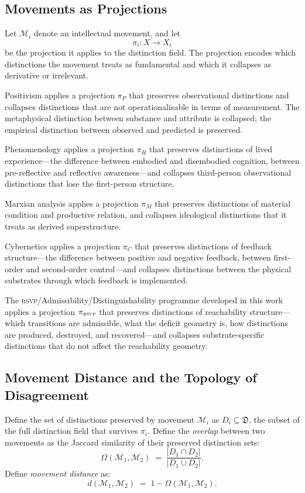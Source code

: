 \documentclass[12pt, letterpaper]{article}
\theoremstyle{remark}
\newcommand{\rsvp}{\textsc{rsvp}}
\begin{document}
\subsection{Movements as Projections}

Let $\mathcal{M}_i$ denote an intellectual movement, and let
\[
  \pi_i : X \to X_i
\]
be the projection it applies to the distinction field.  The projection encodes
which distinctions the movement treats as fundamental and which it collapses
as derivative or irrelevant.

Positivism applies a projection $\pi_P$ that preserves observational
distinctions and collapses distinctions that are not operationalisable in
terms of measurement.  The metaphysical distinction between substance and
attribute is collapsed; the empirical distinction between observed and
predicted is preserved.

Phenomenology applies a projection $\pi_H$ that preserves distinctions of
lived experience---the difference between embodied and disembodied cognition,
between pre-reflective and reflective awareness---and collapses third-person
observational distinctions that lose the first-person structure.

Marxian analysis applies a projection $\pi_M$ that preserves distinctions of
material condition and productive relation, and collapses ideological
distinctions that it treats as derived superstructure.

Cybernetics applies a projection $\pi_C$ that preserves distinctions of
feedback structure---the difference between positive and negative feedback,
between first-order and second-order control---and collapses distinctions
between the physical substrates through which feedback is implemented.

The \rsvp{}/Admissibility/Distinguishability programme developed in this work
applies a projection $\pi_{\rsvp{}}$ that preserves distinctions of
reachability structure---which transitions are admissible, what the deficit
geometry is, how distinctions are produced, destroyed, and recovered---and
collapses substrate-specific distinctions that do not affect the reachability
geometry.

\subsection{Movement Distance and the Topology of Disagreement}

Define the set of distinctions preserved by movement $\mathcal{M}_i$ as
$D_i \subseteq \mathfrak{D}$, the subset of the full distinction field that
survives $\pi_i$.  Define the \emph{overlap} between two movements as the
Jaccard similarity of their preserved distinction sets:
\begin{equation}
  \Omega(\mathcal{M}_1, \mathcal{M}_2)
  \;=\;
  \frac{|D_1 \cap D_2|}{|D_1 \cup D_2|}.
\end{equation}
Define \emph{movement distance} as:
\begin{equation}
  d(\mathcal{M}_1, \mathcal{M}_2) \;=\; 1 - \Omega(\mathcal{M}_1, \mathcal{M}_2).
\end{equation}
\end{document}
